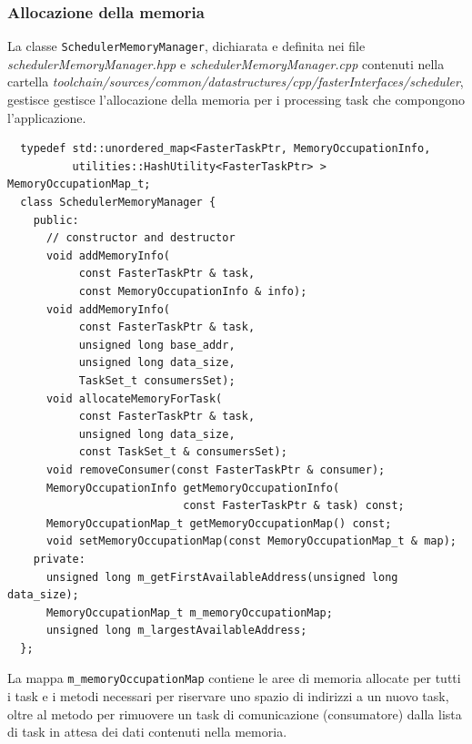 \subsubsection{Allocazione della memoria}
La classe \verb+SchedulerMemoryManager+, dichiarata e definita nei file
\emph{schedulerMemoryManager.hpp} e \emph{schedulerMemoryManager.cpp} contenuti nella cartella
\emph{toolchain/sources/common/datastructures/cpp/fasterInterfaces/scheduler}, gestisce
gestisce l'allocazione della memoria per i processing task che compongono l'applicazione.
\newline
\begin{verbatim}
  typedef std::unordered_map<FasterTaskPtr, MemoryOccupationInfo,
          utilities::HashUtility<FasterTaskPtr> > MemoryOccupationMap_t;
  class SchedulerMemoryManager {
    public:
      // constructor and destructor
      void addMemoryInfo(
           const FasterTaskPtr & task,
           const MemoryOccupationInfo & info);
      void addMemoryInfo(
           const FasterTaskPtr & task,
           unsigned long base_addr,
           unsigned long data_size,
           TaskSet_t consumersSet);
      void allocateMemoryForTask(
           const FasterTaskPtr & task,
           unsigned long data_size,
           const TaskSet_t & consumersSet);
      void removeConsumer(const FasterTaskPtr & consumer);
      MemoryOccupationInfo getMemoryOccupationInfo(
                           const FasterTaskPtr & task) const;
      MemoryOccupationMap_t getMemoryOccupationMap() const;
      void setMemoryOccupationMap(const MemoryOccupationMap_t & map);
    private:
      unsigned long m_getFirstAvailableAddress(unsigned long data_size);          
      MemoryOccupationMap_t m_memoryOccupationMap;          
      unsigned long m_largestAvailableAddress;
  };
\end{verbatim}

La mappa \verb+m_memoryOccupationMap+ contiene le aree di memoria allocate per tutti i
task e i metodi necessari per riservare uno spazio di indirizzi a un nuovo task, oltre
al metodo per rimuovere un task di comunicazione (consumatore) dalla lista di task in
attesa dei dati contenuti nella memoria.
